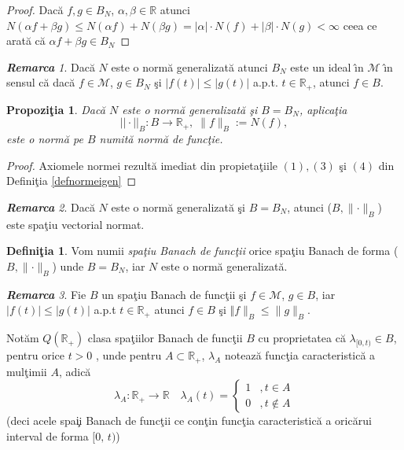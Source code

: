\documentclass[ a4paper, 12pt]{report}
\newtheorem{prop}[theorem]{\bf Propozi\c tia }
\theoremstyle{definition}
\newtheorem{definition}{\bf Defini\c tia}[section]
\theoremstyle{remark}
\newtheorem{remarc}{\bf Remarca}[section]
\numberwithin{equation}{section}
\begin{document}
\begin{proof}
Dac\u a $f,g\in B_N$, $\alpha,\beta \in \mathbb{R}$ atunci $N(\alpha f + \beta g)\leqslant N(\alpha f)+N(\beta g)=\lvert \alpha \rvert \cdot N(f)+\lvert \beta \rvert \cdot N(g)<\infty$ ceea ce arat\u a c\u a $\alpha f + \beta g \in B_N$
\end{proof}

\begin{remarc}
 Dac\u a $N$ este o norm\u a generalizat\u a atunci $B_N$ este un ideal \^\i n $\mathcal{M}$ \^\i n sensul c\u a dac\u a $f \in \mathcal{M}$, $g \in B_N$  \c si $\lvert f(t) \rvert \leqslant \lvert g(t) \rvert$ a.p.t. $t \in \mathbb{R}_+$, atunci $f \in B$.
\end{remarc}

\begin{prop}
Dac\u a $N$ este o norm\u a generalizat\u a \c si $B=B_N$, aplica\c tia
$$||\cdot||_B : B \to \mathbb{R}_+, \; \lVert  f \rVert_B := N(f),$$
este o norm\u a pe $B$ numit\u a \emph{norm\u a de func\c tie}.
\end{prop}

\begin{proof} Axiomele normei rezult\u a imediat din propieta\c tiile $(1), (3)$ \c si $(4)$ din Defini\c tia \ref{defnormeigen}
\end{proof}

\begin{remarc}
Dac\u a $N$ este o norm\u a generalizat\u a \c si $B=B_N$, atunci ($B,\lVert \cdot \rVert_B$) este spa\c tiu vectorial normat.
\end{remarc}

\begin{definition}
Vom numii {\it spa\c tiu Banach de func\c tii} orice spa\c tiu Banach de forma ($B,\lVert \cdot \rVert_B$) unde $B = B_N$, iar $N$ este o norm\u a generalizat\u a.
\end{definition}

\begin{remarc}
Fie $B$ un spa\c tiu Banach de func\c tii \c si $f \in \mathcal{M}$, $g \in B$, iar $\lvert f(t)\rvert \leqslant \lvert g(t)\rvert$ a.p.t $t \in \mathbb{R}_+$ atunci $f \in B$ \c si $\Vert f \rVert_B \leqslant \lVert g \rVert_B$.
\end{remarc}

\medskip

\noindent Not\u am $Q(\mathbb{R}_+)$ clasa spa\c tiilor Banach de func\c tii $B$ cu proprietatea c\u a $\lambda_{[0,t)} \in B$, pentru orice $t>0$ , unde
pentru $ A \subset \mathbb{R}_+ $, $\lambda_A$ noteaz\u a func\c tia caracteristic\u a a mul\c timii $A$, adic\u a
$$ \lambda_A : \mathbb{R}_+ \rightarrow \mathbb{R} \quad \lambda_A (t) =
\begin{cases}
1 &, t \in A \\
0 &, t \notin A
\end{cases}$$
(deci acele spa\c ii Banach de func\c tii ce con\c tin func\c tia caracteristic\u a a oric\u arui interval de forma $[0, \, t)$)
\end{document}
